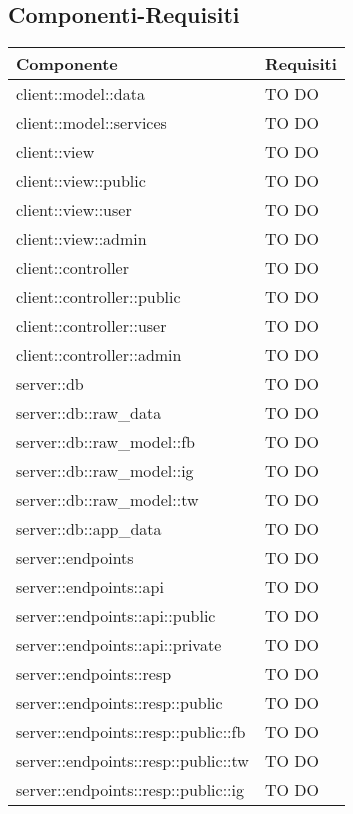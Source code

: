 \subsection{Componenti-Requisiti} %
\label{sub:componenti_requisiti}
\begin{center}
\def\arraystretch{1.5}
\bgroup
\begin{longtable}{| p{9cm} | p{4cm} |}
\hline
\textbf{Componente} & \textbf{Requisiti} \\
\hline
client::model::data  &  TO DO \\
\hline
client::model::services  &  TO DO \\
\hline
client::view  &  TO DO \\
\hline
client::view::public  &  TO DO \\
\hline
client::view::user  &  TO DO \\
\hline
client::view::admin  &  TO DO \\
\hline
client::controller  &  TO DO \\
\hline
client::controller::public  &  TO DO \\
\hline
client::controller::user  &  TO DO \\
\hline
client::controller::admin  &  TO DO \\
\hline
server::db  &  TO DO \\
\hline
server::db::raw\_data  &  TO DO \\
\hline
server::db::raw\_model::fb  &  TO DO \\
\hline
server::db::raw\_model::ig  &  TO DO \\
\hline
server::db::raw\_model::tw  &  TO DO \\
\hline
server::db::app\_data  &  TO DO \\
\hline
server::endpoints  &  TO DO \\
\hline
server::endpoints::api  &  TO DO \\
\hline
server::endpoints::api::public  &  TO DO \\
\hline
server::endpoints::api::private  &  TO DO \\
\hline
server::endpoints::resp  &  TO DO \\
\hline
server::endpoints::resp::public  &  TO DO \\
\hline
server::endpoints::resp::public::fb  &  TO DO \\
\hline
server::endpoints::resp::public::tw  &  TO DO \\
\hline
server::endpoints::resp::public::ig  &  TO DO \\

\end{longtable}
\end{center}
